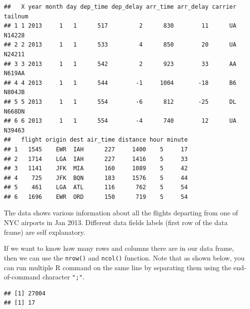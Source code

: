 \documentclass[11pt, letterpaper, twoside]{memoir}\usepackage{knitr}
\begin{document}
\begin{knitrout}
\color{fgcolor}\begin{kframe}
\begin{alltt}
\end{alltt}
\begin{verbatim}
##   X year month day dep_time dep_delay arr_time arr_delay carrier tailnum
## 1 1 2013     1   1      517         2      830        11      UA  N14228
## 2 2 2013     1   1      533         4      850        20      UA  N24211
## 3 3 2013     1   1      542         2      923        33      AA  N619AA
## 4 4 2013     1   1      544        -1     1004       -18      B6  N804JB
## 5 5 2013     1   1      554        -6      812       -25      DL  N668DN
## 6 6 2013     1   1      554        -4      740        12      UA  N39463
##   flight origin dest air_time distance hour minute
## 1   1545    EWR  IAH      227     1400    5     17
## 2   1714    LGA  IAH      227     1416    5     33
## 3   1141    JFK  MIA      160     1089    5     42
## 4    725    JFK  BQN      183     1576    5     44
## 5    461    LGA  ATL      116      762    5     54
## 6   1696    EWR  ORD      150      719    5     54
\end{verbatim}
\end{kframe}
\end{knitrout}

The data shows various information about all the flights departing from one of NYC airports in Jan 2013. Different data fields labels (first row of the data frame) are self explanatory. 

If we want to know how many rows and columns there are in our data frame, then we can use the \texttt{nrow()} and \texttt{ncol()}   function. Note that as shown below, you can run multiple R command on the same line by separating them using the end-of-command character \texttt{";"}.

\begin{knitrout}
\color{fgcolor}\begin{kframe}
\begin{alltt}
 
\end{alltt}
\begin{verbatim}
## [1] 27004
## [1] 17
\end{verbatim}
\end{kframe}
\end{knitrout}
\end{document}

